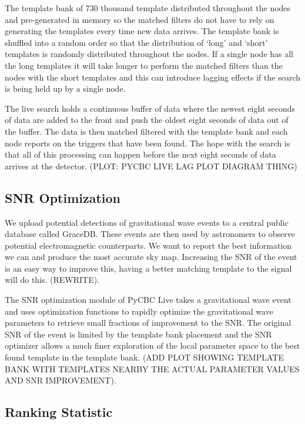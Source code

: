 The template bank of 730 thousand template distributed throughout the nodes and pre-generated in memory so the matched filters do not have to rely on generating the templates every time new data arrives. The template bank is shuffled into a random order so that the distribution of `long' and `short' templates is randomly distributed throughout the nodes. If a single node has all the long templates it will take longer to perform the matched filters than the nodes with the short templates and this can introduce lagging effects if the search is being held up by a single node.

The live search holds a continuous buffer of data where the newest eight seconds of data are added to the front and push the oldest eight seconds of data out of the buffer. The data is then matched filtered with the template bank and each node reports on the triggers that have been found. The hope with the search is that all of this processing can happen before the next eight seconds of data arrives at the detector. (PLOT: PYCBC LIVE LAG PLOT DIAGRAM THING)

\subsection{\label{2:sec:snr-optimization}SNR Optimization}

We upload potential detections of gravitational wave events to a central public database called GraceDB. These events are then used by astronomers to observe potential electromagnetic counterparts. We want to report the best information we can and produce the most accurate sky map. Increasing the SNR of the event is an easy way to improve this, having a better matching template to the signal will do this. (REWRITE).

The SNR optimization module of PyCBC Live takes a gravitational wave event and uses optimization functions to rapidly optimize the gravitational wave parameters to retrieve small fractions of improvement to the SNR. The original SNR of the event is limited by the template bank placement and the SNR optimizer allows a much finer exploration of the local parameter space to the best found template in the template bank. (ADD PLOT SHOWING TEMPLATE BANK WITH TEMPLATES NEARBY THE ACTUAL PARAMETER VALUES AND SNR IMPROVEMENT).

\subsection{\label{2:sec:live-ranking-statistic}Ranking Statistic}

